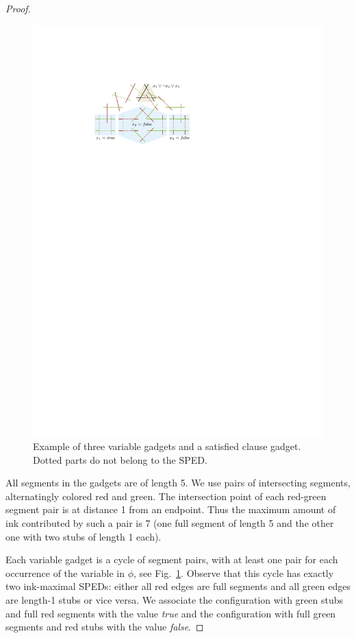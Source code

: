 \documentclass[a4paper,english,numberwithinsect]{eurocg18}
\begin{document}
\begin{proof}
\begin{figure}
			\centering
\includegraphics{Reduction_visual}
\caption{Example of three variable gadgets and a satisfied clause gadget. Dotted parts do not belong to the SPED.}
\label{fig:gadget_connection}
		\end{figure}
	All segments in the gadgets are of length 5.
	We use pairs of intersecting segments, alternatingly colored red and green.
	The intersection point of each red-green segment pair is at distance 1 from an endpoint.
	Thus the maximum amount of ink contributed by such a pair is 7 (one full segment of length 5 and the other one with two stubs of length 1 each).
	
	Each variable gadget is a cycle of segment pairs, with at least one pair for each occurrence of the variable in $\phi$, see Fig.~\ref{fig:gadget_connection}. 
	Observe that this cycle has exactly two ink-maximal SPEDs: either all red edges are full segments and all green edges are length-1 stubs or vice versa.
	We associate the configuration with green stubs and full red segments with the value \emph{true} and the configuration with full green segments and red stubs with the value \emph{false}.
	

\end{proof}
\end{document}

